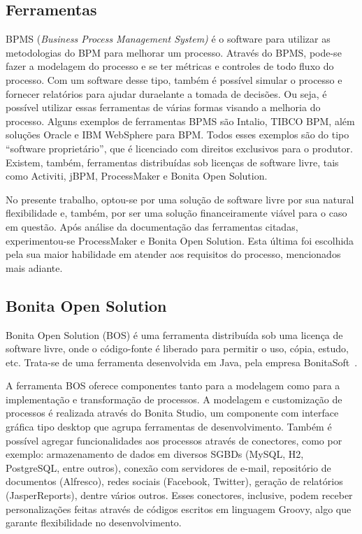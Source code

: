 \documentclass[12pt]{article}
\begin{document}
\subsection{Ferramentas}

BPMS (\emph{Business Process Management System)} é o software para utilizar as metodologias do BPM para melhorar um processo. Através do BPMS, pode-se fazer a modelagem do processo e se ter métricas e controles de todo fluxo do processo. Com um software desse tipo, também é possível simular o processo e fornecer relatórios para ajudar duraelante a tomada de decisões. Ou seja, é possível utilizar essas ferramentas de várias formas visando a melhoria do processo. Alguns exemplos de ferramentas BPMS são Intalio, TIBCO BPM, além soluções Oracle e IBM WebSphere para BPM. Todos esses exemplos são do tipo “software proprietário”, que é licenciado com direitos exclusivos para o produtor. Existem, também, ferramentas distribuídas sob licenças de software livre, tais como Activiti, jBPM, ProcessMaker e Bonita Open Solution.

No presente trabalho, optou-se por uma solução de software livre por sua natural flexibilidade e, também, por ser uma solução financeiramente viável para o caso em questão. Após análise da documentação das ferramentas citadas, experimentou-se ProcessMaker e Bonita Open Solution. Esta última foi escolhida pela sua maior habilidade em atender aos requisitos do processo, mencionados mais adiante.

\subsection{Bonita Open Solution}

Bonita Open Solution (BOS) é uma ferramenta distribuída sob uma licença de software livre, onde o código-fonte é liberado para permitir o uso, cópia, estudo, etc. Trata-se de uma ferramenta desenvolvida em Java, pela empresa BonitaSoft~\cite{BONITASOFT}.

A ferramenta BOS oferece componentes tanto para a modelagem como para a implementação e transformação de processos. A modelagem e customização de processos é realizada através do Bonita Studio, um componente com interface gráfica tipo desktop que agrupa ferramentas de desenvolvimento. Também é possível agregar funcionalidades aos processos através de conectores, como por exemplo: armazenamento de dados em diversos SGBDs (MySQL, H2, PostgreSQL, entre outros), conexão com servidores de e-mail, repositório de documentos (Alfresco), redes sociais (Facebook, Twitter), geração de relatórios (JasperReports), dentre vários outros. Esses conectores, inclusive, podem receber personalizações feitas através de códigos escritos em linguagem Groovy, algo que garante flexibilidade no desenvolvimento.
\end{document}
